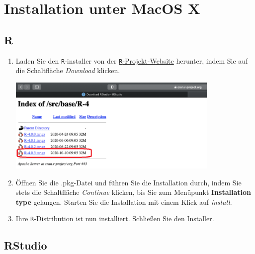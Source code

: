 \documentclass[12pt,a4paper]{article}
\let\origfigure\figure
\let\endorigfigure\endfigure
\renewenvironment{figure}[1][2] {
    \expandafter\origfigure\expandafter[H]
} {
    \endorigfigure
}
\begin{document}
\hypertarget{installation-unter-macos-x}{%
\section{Installation unter MacOS X}\label{installation-unter-macos-x}}

\hypertarget{r-1}{%
\subsection{R}\label{r-1}}

\begin{enumerate}
  \item Laden Sie den \texttt{R}-installer von der \href{https://cran.r-project.org/bin/macosx/base/}{\texttt{R}-Projekt-Website} herunter, indem Sie auf die Schaltfläche \textit{Download} klicken.
  \FloatBarrier
    \begin{figure}[h]
        \centering                      
        \includegraphics[width=0.8\textwidth]{images/mac_r_seite.PNG}
        \caption{R-Projektseite für MacOS}
    \label{fig:r_side_mac}
    \end{figure}
    \FloatBarrier
    \item Öffnen Sie die .pkg-Datei und führen Sie die Installation durch, indem Sie stets die Schaltfläche \textit{Continue} klicken, bis Sie zum Menüpunkt \textbf{Installation type} gelangen. Starten Sie die Installation mit einem Klick auf \textit{install}.
  \item Ihre \texttt{R}-Distribution ist nun installiert. Schließen Sie den Installer.
\end{enumerate}

\hypertarget{rstudio-1}{%
\subsection{RStudio}\label{rstudio-1}}
\end{document}
